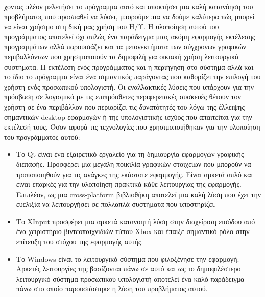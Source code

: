 χοντας πλέον μελετήσει το πρόγραμμα αυτό και αποκτήσει μια καλή κατανόηση του
προβλήματος που προσπαθεί να λύσει, μπορούμε πια να δούμε καλύτερα πώς μπορεί
να είναι χρήσιμο στη δική μας χρήση του Η/Υ. Η υλοποίηση αυτού του προγράμματος
αποτελεί όχι απλώς ένα παράδειγμα μιας ακόμη εφαρμογής εκτέλεσης προγραμμάτων αλλά
παρουσιάζει και τα μειονεκτήματα των σύγχρονων γραφικών περιβαλλόντων που χρησιμοποιούν
τα δημοφιλή για οικιακή χρήση λειτουργικά συστήματα. Η εκτέλεση ενός προγράμματος
και η περιήγηση στο σύστημα αλλά και το ίδιο το πρόγραμμα είναι ένα σημαντικός παράγοντας
που καθορίζει την επιλογή του χρήστη ενός προσωπικού υπολογιστή. Οι εναλλακτικές λύσεις που
υπάρχουν για την πρόσβαση σε λογισμικό με τις επιπρόσθετες περιφερειακές συσκευές
θέτουν τον χρήστη σε ένα περιβάλλον που περιορίζει τις δυνατότητές του λόγω της έλλειψης
σημαντικών desktop εφαρμογών ή της υπολογιστικής ισχύος που απαιτείται για την εκτέλεσή τους.
Όσον αφορά τις τεχνολογίες που χρησιμοποιήθηκαν για την υλοποίηση του προγράμματος αυτού:
\begin{itemize}
	\item
Το Qt είναι ένα εξαιρετικό εργαλείο για τη δημιουργία εφαρμογών γραφικής διεπαφής. Προσφέρει
μια μεγάλη ποικιλία γραφικών στοιχείων που μπορούν να τροποποιηθούν για τις ανάγκες της εκάστοτε
εφαρμογής. Είναι αρκετά απλό και είναι επαρκές για την υλοποίηση πρακτικά κάθε λειτουργίας της
εφαρμογής. Επιπλέον, ως μια cross-platform βιβλιοθήκη αποτελεί μια καλή λύση που έχει την ευελιξία
να λειτουργήσει σε πολλαπλά συστήματα που υποστηρίζει.
	\item
Το XInput προσφέρει μια αρκετά κατανοητή λύση στην διαχείριση εισόδου από ένα χειριστήριο βιντεοπαιχνιδιών
τύπου Xbox και έπαιξε σημαντικό ρόλο στην επίτευξη του στόχου της εφαρμογής αυτής.
	\item
Το Windows είναι το λειτουργικό σύστημα που φιλοξένησε την εφαρμογή. Αρκετές λειτουργίες της βασίζονται πάνω
σε αυτό και ως το δημοφιλέστερο λειτουργικό σύστημα προσωπικού υπολογιστή αποτελεί ένα καλό παράδειγμα πάνω
στο οποίο παρουσιάστηκε η λύση του προβλήματος αυτού.
\end{itemize} 

 

